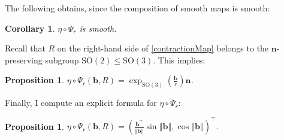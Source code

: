 \documentclass[a4paper,11pt]{scrartcl}
\newcounter{dummy}
\numberwithin{dummy}{section}
\theoremstyle{plain}
\newtheorem{proposition}[dummy]{Proposition}
\theoremstyle{plain}
\theoremstyle{plain}
\theoremstyle{plain}
\newtheorem{corollary}[dummy]{Corollary}
\theoremstyle{nonumberplain}
\newcommand{\Ltwonorm}[1]{\left\Vert #1 \right\Vert} %
\newcommand{\SO}{\mathrm{SO}}
\begin{document}
	The following obtains, since the composition of smooth maps is smooth:
	\begin{corollary}
		$ \eta \circ \Psi_{r} $ is smooth.
	\end{corollary}
	
	Recall that $ R $ on the right-hand side of \eqref{contractionMap} belongs to the $ \mathbf{n} $-preserving subgroup $ \SO(2) \le \SO(3) $. This implies:
	\begin{proposition}
		\label{etaPsiSimplified}
		$ \eta \circ \Psi_{r}  (\mathbf{b}, R) 
		= \exp_{\SO(3)} \left(\frac{\mathbf{b}}{r}\right) \mathbf{n} $.
	\end{proposition}
	
	Finally, I compute an explicit formula for $ \eta \circ \Psi_{r} $:
	
	\begin{proposition}
		\label{etaPsiFormula}
		$ \eta \circ \Psi_{r}  (\mathbf{b}, R) 
		= \left( \frac{\mathbf{b}^{\top}}{\Ltwonorm{\mathbf{b}}} \sin \Ltwonorm{\mathbf{b}}, \cos \Ltwonorm{\mathbf{b}} \right)^{\top} $.
	\end{proposition}
	
\end{document}
